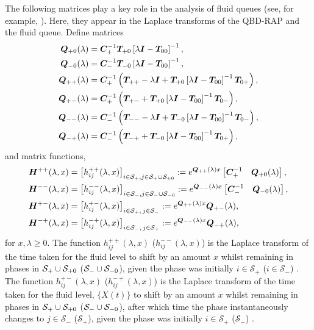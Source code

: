 The following matrices play a key role in the analysis of fluid queues (see, for example, \cite{bean2009,dasilva2005}). Here, they appear in the Laplace transforms of the QBD-RAP and the fluid queue. Define matrices
\begin{align*}
	\boldsymbol Q_{+0}(\lambda) &= \boldsymbol C_+^{-1}\boldsymbol T_{+0}\left[\lambda \boldsymbol I - \boldsymbol T_{00}\right]^{-1},
	\\\boldsymbol Q_{-0}(\lambda) &= \boldsymbol C_-^{-1}\boldsymbol T_{-0}\left[\lambda \boldsymbol I - \boldsymbol T_{00}\right]^{-1},
	\\\boldsymbol Q_{++}(\lambda) &= \boldsymbol C_+^{-1} \left(\boldsymbol T_{++} - \lambda \boldsymbol I + \boldsymbol T_{+0}\left[\lambda \boldsymbol I - \boldsymbol T_{00}\right]^{-1}\boldsymbol T_{0+}\right),
	\\\boldsymbol Q_{+-}(\lambda) &= \boldsymbol C_+^{-1} \left(\boldsymbol T_{+-} + \boldsymbol T_{+0}\left[\lambda \boldsymbol I - \boldsymbol T_{00}\right]^{-1}\boldsymbol T_{0-} \right) ,
	\\\boldsymbol Q_{--}(\lambda) &= \boldsymbol C_-^{-1} \left(\boldsymbol T_{--}  - \lambda \boldsymbol I + \boldsymbol T_{-0}\left[\lambda \boldsymbol I - \boldsymbol T_{00}\right]^{-1}\boldsymbol T_{0-}\right),
	\\\boldsymbol Q_{-+}(\lambda) &=\boldsymbol C_-^{-1} \left(\boldsymbol T_{-+}+ \boldsymbol T_{-0}\left[\lambda \boldsymbol I - \boldsymbol T_{00}\right]^{-1}\boldsymbol T_{0+}\right) ,
\end{align*}
and matrix functions,
\begin{align}
	\boldsymbol H^{++}(\lambda,x)&= \left[h_{ij}^{++}(\lambda,x)\right]_{i\in \mathcal S_+,j\in\mathcal S_{+}\cup\mathcal{S}_{+0}} := e^{\boldsymbol{Q}_{++}(\lambda)x}\begin{bmatrix} \boldsymbol C_+^{-1} & \boldsymbol Q_{+0}(\lambda) \end{bmatrix},  \label{eqn: lst 1}
	\\\boldsymbol H^{--}(\lambda,x) &= \left[h_{ij}^{--}(\lambda,x)\right]_{i\in\mathcal S_-,j\in\mathcal S_{-}\cup\mathcal{S}_{-0}}:= e^{\boldsymbol{Q}_{--}(\lambda)x}\begin{bmatrix} \boldsymbol C_-^{-1} & \boldsymbol Q_{-0}(\lambda) \end{bmatrix},
	\\\boldsymbol H^{+-}(\lambda,x)  &= \left[h_{ij}^{+-}(\lambda,x)\right]_{i\in\mathcal S_+,\,j\in\mathcal S_-}:= e^{\boldsymbol{Q}_{++}(\lambda)x}\boldsymbol{Q}_{+-}(\lambda), 
	\\\boldsymbol H^{-+}(\lambda,x)&= \left[h_{ij}^{-+}(\lambda,x)\right]_{i\in\mathcal S_-,\, j\in\mathcal S_+} := e^{\boldsymbol{Q}_{--}(\lambda)x}\boldsymbol{Q}_{-+}(\lambda) , \label{eqn: lst 4}
\end{align}
for \(x,\lambda\geq 0\). The function \(h_{ij}^{++}(\lambda,x)\) (\(h_{ij}^{--}(\lambda,x)\)) is the Laplace transform of the time taken for the fluid level to shift by an amount \(x\) whilst remaining in phases in \(\mathcal S_+\cup\mathcal{S}_{+0}\) (\(\mathcal S_-\cup\mathcal{S}_{-0}\)), given the phase was initially \(i\in\mathcal S_+\) (\(i\in\mathcal S_-\)) \citep{bean2005}. The function \(h_{ij}^{+-}(\lambda,x)\) (\(h_{ij}^{-+}(\lambda,x)\)) is the Laplace transform of the time taken for the fluid level, \(\{X(t)\}\) to shift by an amount \(x\) whilst remaining in phases in \(\mathcal S_+\cup\mathcal{S}_{+0}\) (\(\mathcal S_-\cup\mathcal{S}_{-0}\)), after which time the phase instantaneously changes to \(j\in\mathcal S_-\) (\(\mathcal S_+\)), given the phase was initially \(i\in\mathcal S_+\) (\(\mathcal S_-\)) \citep{bean2005}.

